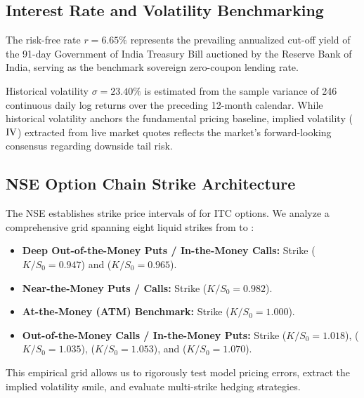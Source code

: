 \subsection{Interest Rate and Volatility Benchmarking}

The risk-free rate $r = 6.65\%$ represents the prevailing annualized cut-off yield of the 91-day Government of India Treasury Bill auctioned by the Reserve Bank of India, serving as the benchmark sovereign zero-coupon lending rate. 

Historical volatility $\sigma = 23.40\%$ is estimated from the sample variance of 246 continuous daily log returns over the preceding 12-month calendar. While historical volatility anchors the fundamental pricing baseline, implied volatility ($\operatorname{IV}$) extracted from live market quotes reflects the market's forward-looking consensus regarding downside tail risk.

\subsection{NSE Option Chain Strike Architecture}

The NSE establishes strike price intervals of  for ITC options. We analyze a comprehensive grid spanning eight liquid strikes from  to :
\begin{itemize}[leftmargin=1.5em, itemsep=1pt, parsep=0pt]
    \item \textbf{Deep Out-of-the-Money Puts / In-the-Money Calls:} Strike  ($K/S_0 = 0.947$) and  ($K/S_0 = 0.965$).
    \item \textbf{Near-the-Money Puts / Calls:} Strike  ($K/S_0 = 0.982$).
    \item \textbf{At-the-Money (ATM) Benchmark:} Strike  ($K/S_0 = 1.000$).
    \item \textbf{Out-of-the-Money Calls / In-the-Money Puts:} Strike  ($K/S_0 = 1.018$),  ($K/S_0 = 1.035$),  ($K/S_0 = 1.053$), and  ($K/S_0 = 1.070$).
\end{itemize}

This empirical grid allows us to rigorously test model pricing errors, extract the implied volatility smile, and evaluate multi-strike hedging strategies.

\clearpage
